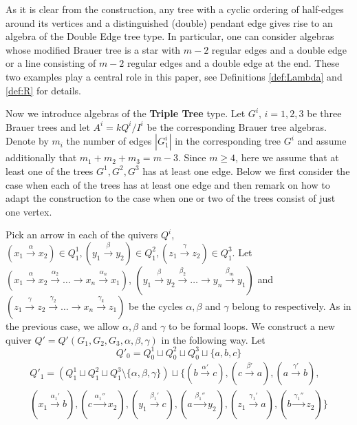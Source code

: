 \documentclass[12pt]{amsart}
\theoremstyle{plain}
\theoremstyle{remark}
\theoremstyle{definition}
\begin{document}
As it is clear from the construction, any tree with a cyclic ordering of half-edges around its vertices and a distinguished (double) pendant edge gives rise to an algebra of the Double Edge tree type. In particular, one can consider algebras whose modified Brauer tree is a star with $m-2$ regular edges and a double edge or a line consisting of $m-2$ regular edges and a double edge at the end. These two examples play a central role in this paper, see Definitions \ref{def:Lambda} and \ref{def:R} for details.  


Now we introduce algebras of the {\bf Triple Tree} type. Let $G^i$, $i = 1,2,3$ be three Brauer trees and let $A^i = kQ^i/I^i$ be the corresponding Brauer tree algebras. Denote by $m_i$ the number of edges $|G^i_1|$ in the corresponding tree $G^i$ and assume additionally that $m_1 + m_2 + m_3 = m-3$.
 Since $m \geq 4$, here we assume that at least one of the trees $G^1, G^2, G^3$ has at least one edge.  Below we first consider the case when each of the trees has at least one edge and then remark on how to adapt the construction to the case when one or two of the trees consist of just one vertex.

Pick an arrow in each of the quivers $Q^i$, $(x_1 \xrightarrow{\alpha} x_2) \in Q^1_1, (y_1 \xrightarrow{\beta} y_2) \in Q^2_1, (z_1 \xrightarrow{\gamma} z_2) \in Q^3_1$. Let ${(x_1 \xrightarrow{\alpha} x_2 \xrightarrow{\alpha_2}  \dots \xrightarrow{} x_n \xrightarrow{\alpha_n} x_1)}$, ${(y_1 \xrightarrow{\beta} y_2 \xrightarrow{\beta_2} \dots \xrightarrow{} y_n \xrightarrow{\beta_m} y_1)}$ and  ${(z_1 \xrightarrow{\gamma} z_2 \xrightarrow{\gamma_2} \dots \xrightarrow{} x_n \xrightarrow{\gamma_k} z_1)}$ be the cycles $\alpha, \beta$ and $\gamma$ belong to respectively. As in the previous case, we allow $\alpha, \beta$ and $\gamma$ to be formal loops. We construct a new quiver $Q' = Q'(G_1, G_2, G_3, \alpha, \beta, \gamma)$ in the following way. Let 
$$ Q'_0 = Q^1_0 \sqcup Q^2_0 \sqcup Q^3_0 \sqcup \{a, b, c\}$$
\begin{multline*} Q'_1 =( Q^1_1 \sqcup Q^2_1 \sqcup Q^3_1  \setminus \{\alpha, \beta, \gamma\}) \sqcup \{ (b \xrightarrow{\alpha'} c), (c \xrightarrow{\beta'} a), (a \xrightarrow{\gamma'} b), \\ (x_1 \xrightarrow{\alpha_1'} b), (c \xrightarrow{\alpha_1''} x_2), (y_1\xrightarrow{\beta_1'} c), (a \xrightarrow{\beta_1''} y_2), (z_1 \xrightarrow{\gamma_1'} a), (b \xrightarrow{\gamma_1''} z_2)  \} 
\end{multline*}
\end{document}
